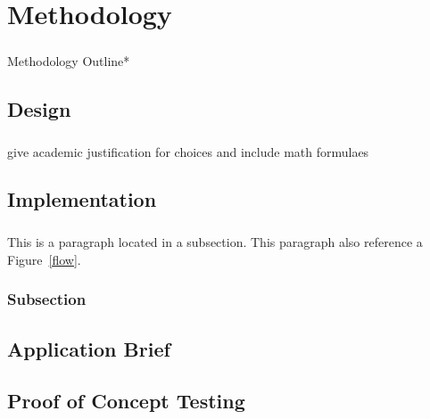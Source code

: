 \chapter{Methodology}
\label{chap:chapter1}

\paragraph{}Methodology Outline*

\section{Design}
\label{sec:section1}
\paragraph{}

\paragraph{}give academic justification for choices and include math formulaes
\section{Implementation}
\label{sec:section2}

\paragraph{}This is a paragraph located in a subsection.  This paragraph also reference a  Figure~\ref{flow}.



\subsection{Subsection}
\label{ssec:subsection2}


\section{Application Brief}
\label{sec:section3}

\section{Proof of Concept Testing}
\label{sec:section4}


